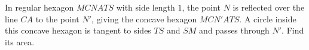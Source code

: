 In regular hexagon $MCNATS$ with side length $1$, the point $N$ is reflected over the line $CA$ to the point $N'$, giving the concave hexagon $MCN'ATS$. A circle inside this concave hexagon is tangent to sides $TS$ and $SM$ and passes through $N'$. Find its area.
